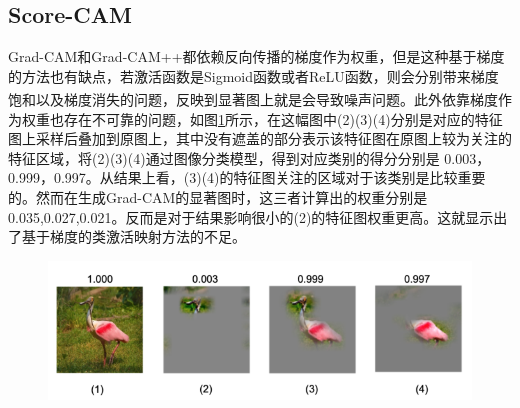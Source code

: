 \subsection{Score-CAM}
Grad-CAM和Grad-CAM++都依赖反向传播的梯度作为权重，但是这种基于梯度的方法也有缺点，若激活函数是Sigmoid函数或者ReLU函数，则会分别带来梯度饱和以及梯度消失的问题\textsuperscript{\cite{simonyan2014visualising}}，反映到显著图上就是会导致噪声问题。此外依靠梯度作为权重也存在不可靠的问题，如图\ref{fig:scorecam1}所示，在这幅图中(2)(3)(4)分别是对应的特征图上采样后叠加到原图上，其中没有遮盖的部分表示该特征图在原图上较为关注的特征区域，将(2)(3)(4)通过图像分类模型，得到对应类别的得分分别是 0.003，0.999，0.997。从结果上看，(3)(4)的特征图关注的区域对于该类别是比较重要的。然而在生成Grad-CAM的显著图时，这三者计算出的权重分别是0.035,0.027,0.021。反而是对于结果影响很小的(2)的特征图权重更高。这就显示出了基于梯度的类激活映射方法的不足。


\begin{figure}[h]
	\centering 
	\includegraphics[width=15cm]{fig/ch2/scorecam1.png}
	\label{fig:scorecam1}
\end{figure}
\vspace{0.5cm}

